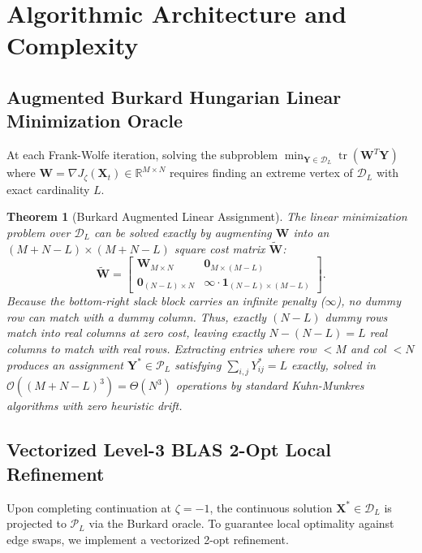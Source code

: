 \documentclass[a4paper,fleqn]{cas-dc}
\theoremstyle{thmstyleone}
\newtheorem{theorem}{Theorem}
\theoremstyle{thmstyletwo}
\theoremstyle{thmstylethree}
\begin{document}
\section{Algorithmic Architecture and Complexity}
\label{sec:algo}

\subsection{Augmented Burkard Hungarian Linear Minimization Oracle}
At each Frank-Wolfe iteration, solving the subproblem $\min_{\mathbf{Y} \in \mathcal{D}_L} \operatorname{tr}(\mathbf{W}^T\mathbf{Y})$ where $\mathbf{W} = \nabla J_\zeta(\mathbf{X}_t) \in \mathbb{R}^{M \times N}$ requires finding an extreme vertex of $\mathcal{D}_L$ with exact cardinality $L$.

\begin{theorem}[Burkard Augmented Linear Assignment]
\label{thm:burkard}
The linear minimization problem over $\mathcal{D}_L$ can be solved exactly by augmenting $\mathbf{W}$ into an $(M+N-L) \times (M+N-L)$ square cost matrix $\widetilde{\mathbf{W}}$:
\begin{equation}
\widetilde{\mathbf{W}} = \begin{bmatrix}
\mathbf{W}_{M \times N} & \mathbf{0}_{M \times (M - L)} \\
\mathbf{0}_{(N - L) \times N} & \infty \cdot \mathbf{1}_{(N - L) \times (M - L)}
\end{bmatrix}.
\label{eq:augmented_W}
\end{equation}
Because the bottom-right slack block carries an infinite penalty ($\infty$), no dummy row can match with a dummy column. Thus, exactly $(N-L)$ dummy rows match into real columns at zero cost, leaving exactly $N - (N - L) = L$ real columns to match with real rows. Extracting entries where row $< M$ and col $< N$ produces an assignment $\mathbf{Y}^* \in \mathcal{P}_L$ satisfying $\sum_{i,j} Y^*_{ij} = L$ exactly, solved in $\mathcal{O}((M+N-L)^3) = \Theta(N^3)$ operations by standard Kuhn-Munkres algorithms with zero heuristic drift.
\end{theorem}

\subsection{Vectorized Level-3 BLAS 2-Opt Local Refinement}
Upon completing continuation at $\zeta = -1$, the continuous solution $\mathbf{X}^* \in \mathcal{D}_L$ is projected to $\mathcal{P}_L$ via the Burkard oracle. To guarantee local optimality against edge swaps, we implement a vectorized 2-opt refinement.
\end{document}
